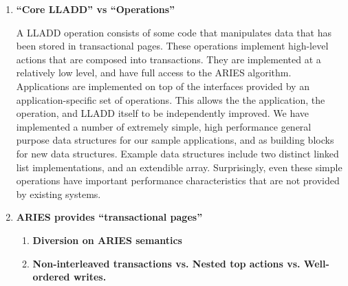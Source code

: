 \documentclass[letterpaper,english]{article}
\begin{document}
\begin{enumerate}

\begin{enumerate}

  \item {\bf {}``Core LLADD'' vs {}``Operations''}

A LLADD operation consists of some code that manipulates data that has
been stored in transactional pages.  These operations implement
high-level actions that are composed into transactions.  They are
implemented at a relatively low level, and have full access to the
ARIES algorithm.  Applications are implemented on top of the
interfaces provided by an application-specific set of operations.
This allows the the application, the operation, and LLADD itself to be
independently improved.  We have implemented a number of extremely
simple, high performance general purpose data structures for our
sample applications, and as building blocks for new data structures.
Example data structures include two distinct linked list
implementations, and an extendible array.  Surprisingly, even these
simple operations have important performance characteristics that are
not provided by existing systems.

  \item {\bf  ARIES provides {}``transactional pages'' }

\begin{enumerate}

  \item {\bf Diversion on ARIES semantics }
  

  \item {\bf Non-interleaved transactions vs. Nested top actions
  vs. Well-ordered writes.}

    


\end{enumerate}
\end{enumerate}
\end{enumerate}
\end{document}
